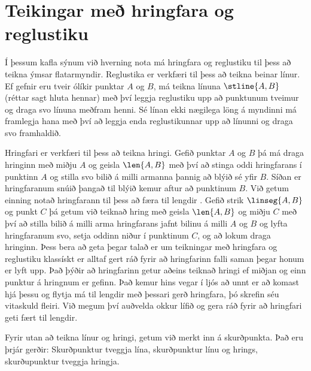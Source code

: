 \section{Teikingar með hringfara og reglustiku}

Í þessum kafla sýnum við hverning nota má hringfara og reglustiku til þess að teikna ýmsar flatarmyndir. Reglustika er verkfæri til þess að teikna beinar línur. Ef gefnir eru tveir ólíkir punktar $A$ og $B$, má teikna línuna $\stline{A,B}$ (réttar sagt hluta hennar) með því leggja reglustiku upp að punktunum tveimur og draga svo línuna meðfram henni. Sé línan ekki nægilega löng á myndinni má framlegja hana með því að leggja enda reglustikunnar upp að línunni og draga svo framhaldið.

\begin{figure}[htbp]
\centering

\end{figure}

Hringfari er verkfæri til þess að teikna hringi. Gefið punktar $A$ og $B$ þá má draga hringinn með miðju $A$ og geisla $\len{A,B}$ með því að stinga oddi hringfarans í punktinn $A$ og stilla svo bilið á milli armanna þannig að blýið sé yfir $B$. Síðan er hringfaranum snúið þangað til blýið kemur aftur að punktinum $B$. Við getum einning notað hringfarann til þess að \glqq færa til lengdir \grqq. Gefið strik $\linseg{A,B}$ og punkt $C$ þá getum við teiknað hring með geisla $\len{A,B}$ og miðju $C$ með því að stilla bilið á milli arma hringfarans jafnt bilinu á milli $A$ og $B$ og lyfta hringfaranum svo, setja oddinn niður í punktinum $C$, og að lokum draga hringinn. Þess bera að geta þegar talað er um teikningar með hringfara og reglustiku klassískt er alltaf gert ráð fyrir að hringfarinn \glqq falli saman \grqq{} þegar honum er lyft upp. Það þýðir að hringfarinn getur aðeins teiknað hringi ef miðjan og einn punktur á hringnum er gefinn. Það kemur hins vegar í ljós að unnt er að komast hjá þessu og flytja má til lengdir með þessari gerð hringfara, þó skrefin séu vitaskuld fleiri. Við megum því auðvelda okkur lífið og gera ráð fyrir að hringfari geti fært til lengdir.

\begin{figure}[htbp]
\centering

\end{figure}

Fyrir utan að teikna línur og hringi, getum við merkt inn á skurðpunkta. Það eru þrjár gerðir: Skurðpunktur tveggja lína, skurðpunktur línu og hrings, skurðupunktur tveggja hringja.

